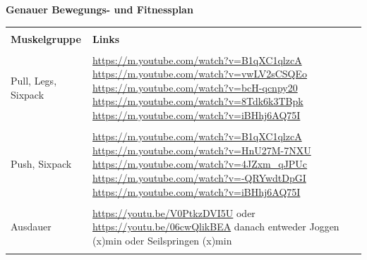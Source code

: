 \newline
\pagebreak
\newline
\textbf{Genauer Bewegungs- und Fitnessplan}
\newline
\begin{table}[htp]
  \begin{tabularx}{\textwidth}{l X}\hline \\
    \textbf{Muskelgruppe} & \textbf{Links}  \\\hline \\
    Pull, Legs, Sixpack & \url{https://m.youtube.com/watch?v=B1qXC1qlzcA}
    \newline
    \url{https://m.youtube.com/watch?v=vwLV2sCSQEo}
    \newline
    \url{https://m.youtube.com/watch?v=bcH-qcnpy20}
    \newline
    \url{https://m.youtube.com/watch?v=8Tdk6k3TBpk}
    \newline
    \url{https://m.youtube.com/watch?v=iBHhj6AQ75I} \\ \\
    Push, Sixpack & \url{https://m.youtube.com/watch?v=B1qXC1qlzcA}
    \newline
    \url{https://m.youtube.com/watch?v=HnU27M-7NXU}
    \newline
    \url{https://m.youtube.com/watch?v=4JZxm_qJPUc}
    \newline
    \url{https://m.youtube.com/watch?v=-QRYwdtDpGI}
    \newline
    \url{https://m.youtube.com/watch?v=iBHhj6AQ75I} \\ \\
    Ausdauer & \url{https://youtu.be/V0PtkzDVI5U}
    \newline
    oder
    \newline
    \url{https://youtu.be/06cwQlikBEA}
    \newline
    danach entweder Joggen (x)min oder Seilspringen (x)min \\
    \\\hline
  \end{tabularx}
\end{table}

